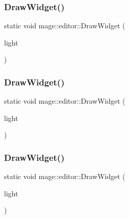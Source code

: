 \hypertarget{namespacemage_1_1editor_a6d7178801c17a609952f0c75389c4b92}{}\label{namespacemage_1_1editor_a6d7178801c17a609952f0c75389c4b92} 
\subsubsection{\texorpdfstring{Draw\+Widget()}{DrawWidget()}\hspace{0.1cm}{\footnotesize\ttfamily [9/20]}}
{\footnotesize\ttfamily static void mage\+::editor\+::\+Draw\+Widget (\begin{DoxyParamCaption}\item[{\hyperlink{classmage_1_1_ambient_light}{Ambient\+Light} \&}]{light }\end{DoxyParamCaption})\hspace{0.3cm}{\ttfamily [static]}}

\hypertarget{namespacemage_1_1editor_aef32dcc2d0eea998af9d9a0f59d1bb29}{}\label{namespacemage_1_1editor_aef32dcc2d0eea998af9d9a0f59d1bb29} 
\subsubsection{\texorpdfstring{Draw\+Widget()}{DrawWidget()}\hspace{0.1cm}{\footnotesize\ttfamily [10/20]}}
{\footnotesize\ttfamily static void mage\+::editor\+::\+Draw\+Widget (\begin{DoxyParamCaption}\item[{\hyperlink{classmage_1_1_directional_light}{Directional\+Light} \&}]{light }\end{DoxyParamCaption})\hspace{0.3cm}{\ttfamily [static]}}

\hypertarget{namespacemage_1_1editor_a8012cb9cb72a5daafccb06bcf70ad75f}{}\label{namespacemage_1_1editor_a8012cb9cb72a5daafccb06bcf70ad75f} 
\subsubsection{\texorpdfstring{Draw\+Widget()}{DrawWidget()}\hspace{0.1cm}{\footnotesize\ttfamily [11/20]}}
{\footnotesize\ttfamily static void mage\+::editor\+::\+Draw\+Widget (\begin{DoxyParamCaption}\item[{\hyperlink{classmage_1_1_omni_light}{Omni\+Light} \&}]{light }\end{DoxyParamCaption})\hspace{0.3cm}{\ttfamily [static]}}

